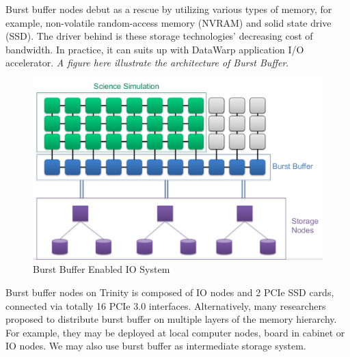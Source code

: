 Burst buffer nodes debut as a rescue by utilizing various types of memory,
for example, non-volatile random-access memory (NVRAM) and solid state drive (SSD).
The driver behind is these storage technologies' decreasing cost of bandwidth.
In practice, it can suits up with DataWarp application I/O accelerator\cite{DataWarp}.
\textit{A figure here illustrate the architecture of Burst Buffer}.
\begin{figure}[!t]
        \centering
        \includegraphics[width=6.6in]{BBArchitecture}
        \caption{Burst Buffer Enabled IO System}
        \label{Fig:BBArchitecture}
\end{figure}
Burst buffer nodes on Trinity is composed of IO nodes and 2 PCIe SSD cards,
connected via totally 16 PCIe 3.0 interfaces.
Alternatively, many researchers proposed to distribute burst buffer 
on multiple layers of the memory hierarchy\cite{Romanus:CORR:15}.
For example, they may be deployed at local computer nodes, board in cabinet or IO nodes.
We may also use burst buffer as intermediate storage system.

